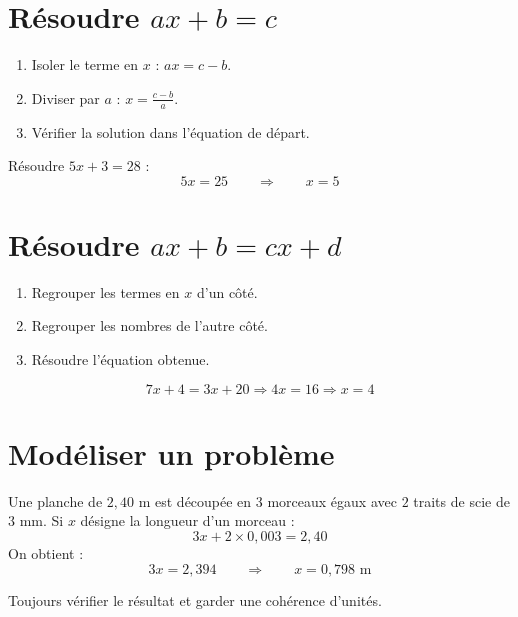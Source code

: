 \documentclass[11pt,a4paper,twoside]{book}
\begin{document}
\section{Résoudre \(ax+b=c\)}
\begin{methodebox}
\begin{enumerate}
\item Isoler le terme en \(x\) : \(ax=c-b\).
\item Diviser par \(a\) : \(x=\frac{c-b}{a}\).
\item Vérifier la solution dans l'équation de départ.
\end{enumerate}
\end{methodebox}

\begin{exemplebox}
Résoudre \(5x+3=28\) :
\[
5x=25 \qquad\Rightarrow\qquad x=5
\]
\end{exemplebox}

\section{Résoudre \(ax+b=cx+d\)}
\begin{methodebox}
\begin{enumerate}
\item Regrouper les termes en \(x\) d'un côté.
\item Regrouper les nombres de l'autre côté.
\item Résoudre l'équation obtenue.
\end{enumerate}
\end{methodebox}

\begin{exemplebox}
\[
7x+4=3x+20
\Rightarrow 4x=16
\Rightarrow x=4
\]
\end{exemplebox}

\section{Modéliser un problème}
\begin{exemplebox}
Une planche de \(2{,}40\) m est découpée en \(3\) morceaux égaux avec \(2\) traits de scie de \(3\) mm.
Si \(x\) désigne la longueur d'un morceau :
\[
3x+2\times 0{,}003=2{,}40
\]
On obtient :
\[
3x=2{,}394 \qquad\Rightarrow\qquad x=0{,}798\text{ m}
\]
\end{exemplebox}

\begin{attentionbox}
Toujours vérifier le résultat et garder une cohérence d'unités.
\end{attentionbox}
\end{document}
